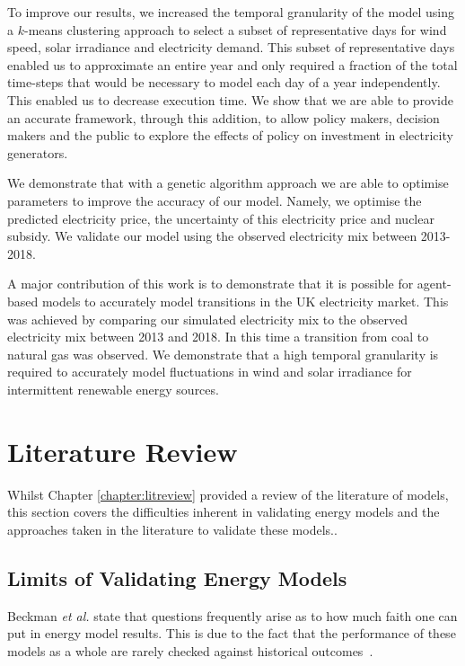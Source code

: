 To improve our results, we increased the temporal granularity of the model using a $k$-means clustering approach to select a subset of representative days for wind speed, solar irradiance and electricity demand. This subset of representative days enabled us to approximate an entire year and only required a fraction of the total time-steps that would be necessary to model each day of a year independently. This enabled us to decrease execution time. We show that we are able to provide an accurate framework, through this addition, to allow policy makers, decision makers and the public to explore the effects of policy on investment in electricity generators. 

We demonstrate that with a genetic algorithm approach we are able to optimise parameters to improve the accuracy of our model. Namely, we optimise the predicted electricity price, the uncertainty of this electricity price and nuclear subsidy. We validate our model using the observed electricity mix between 2013-2018.

A major contribution of this work is to demonstrate that it is possible for agent-based models to accurately model transitions in the UK electricity market. This was achieved by comparing our simulated electricity mix to the observed electricity mix between 2013 and 2018. In this time a transition from coal to natural gas was observed. We demonstrate that a high temporal granularity is required to accurately model fluctuations in wind and solar irradiance for intermittent renewable energy sources.



\section{Literature Review}


Whilst Chapter \ref{chapter:litreview} provided a review of the literature of models, this section covers the difficulties inherent in validating energy models and the approaches taken in the literature to validate these models..

\subsection{Limits of Validating Energy Models}

Beckman \textit{et al.} state that questions frequently arise as to how much faith one can put in energy model results. This is due to the fact that the performance of these models as a whole are rarely checked against historical outcomes~\cite{Beckman2011}.


